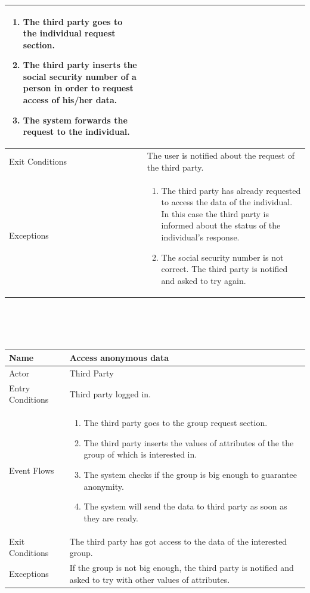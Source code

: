 \documentclass{article}
\begin{document}
\begin{legal}
\begin{legal}
\begin{legal}
\begin{tabular}{| m{3.5cm} | m{8cm}| }
\begin{enumerate}
									\item The third party goes to the individual request section.
									\item The third party inserts the social security number of a person in order to request access of his/her data.
									\item The system forwards the request to the individual.
				\end{enumerate}\\
				\hline
					Exit Conditions & The user is notified about the request of the third party.\\
				\hline
					Exceptions & \begin{enumerate}
					\item The third party has already requested to access the data of the individual. In this case the third party is informed about the status of the individual's response.
					\item The social security number is not correct. The third party is notified and asked to try again.
					\end{enumerate}\\
				\hline
				\end{tabular}
				\\\\\\
				\begin{tabular}{| m{3.5cm} | m{8cm}| }
				\hline
					Name & Access anonymous data\\
				\hline
					Actor & Third Party\\
				\hline
					Entry Conditions & Third party logged in.\\
				\hline
					Event Flows & \begin{enumerate}
									\item The third party goes to the group request section.
									\item The third party inserts the values of attributes of the the group of which is interested in.
									\item The system checks if the group is big enough to guarantee anonymity.
									\item The system will send the data to third party as soon as they are ready.
				\end{enumerate}\\
				\hline
					Exit Conditions & The third party has got access to the data of the interested group.\\
				\hline
					Exceptions & If the group is not big enough, the third party is notified and asked to try with other values of attributes.\\

\end{tabular}
\end{legal}
\end{legal}
\end{legal}
\end{document}

